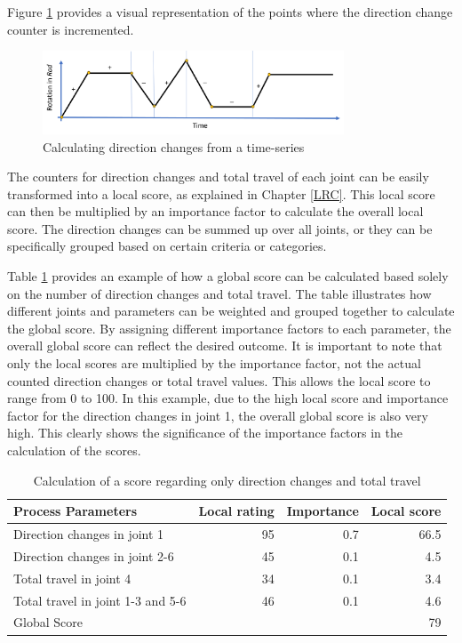 Figure \ref{dirchange} provides a visual representation of the points where the direction change counter is incremented.


\begin{figure}[H]
	\centerline{\includegraphics[width=0.8\textwidth]{figures/dirchange.png}}
	\caption{Calculating direction changes from a time-series}
	\label{dirchange}
\end{figure}

The counters for direction changes and total travel of each joint can be easily transformed into a local score, as explained in Chapter \ref{LRC}. This local score can then be multiplied by an importance factor to calculate the overall local score. The direction changes can be summed up over all joints, or they can be specifically grouped based on certain criteria or categories.  

Table \ref{exampleDirTravel} provides an example of how a global score can be calculated based solely on the number of direction changes and total travel. The table illustrates how different joints and parameters can be weighted and grouped together to calculate the global score. By assigning different importance factors to each parameter, the overall global score can reflect the desired outcome. It is important to note that only the local scores are multiplied by the importance factor, not the actual counted direction changes or total travel values. This allows the local score to range from 0 to 100. In this example, due to the high local score and importance factor for the direction changes in joint 1, the overall global score is also very high. This clearly shows the significance of the importance factors in the calculation of the scores.

\begin{table}[H]
	\centering
	\begin{tabular}{||l|r|r|r||}
		Process Parameters & Local rating & Importance & Local score\\
		\hline
		\hline
		\hline
		
		Direction changes in joint 1 & 95 & 0.7 & 66.5\\
		Direction changes in joint 2-6 & 45& 0.1&4.5\\
		Total travel in joint 4& 34& 0.1&3.4\\
		Total travel in joint 1-3 and 5-6& 46&0.1&4.6\\
		\hline
		\hline
		\hline
		Global Score& & &79\\
		\hline
		\hline
	\end{tabular}
	
	\caption{Calculation of a score regarding only direction changes and total travel}
	\label{exampleDirTravel}
\end{table}

